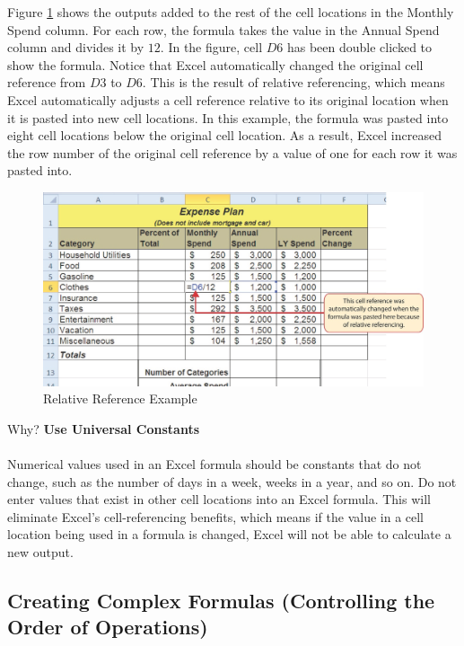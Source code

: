 Figure \ref{02:fig05} shows the outputs added to the rest of the cell locations in the Monthly Spend column. For each row, the formula takes the value in the Annual Spend column and divides it by $ 12 $. In the figure, cell $ D6 $ has been double clicked to show the formula. Notice that Excel automatically changed the original cell reference from $ D3 $ to $ D6 $. This is the result of relative referencing, which means Excel automatically adjusts a cell reference relative to its original location when it is pasted into new cell locations. In this example, the formula was pasted into eight cell locations below the original cell location. As a result, Excel increased the row number of the original cell reference by a value of one for each row it was pasted into.

\begin{figure}[H]
	\centering
	\includegraphics[width=\maxwidth{.95\linewidth}]{gfx/ch02_fig05}
	\caption{Relative Reference Example}
	\label{02:fig05}
\end{figure}

\begin{center}
	\begin{infobox}{Why?}
		\textbf{Use Universal Constants}
		\\
		\\
		Numerical values used in an Excel formula should be constants that do not change, such as the number of days in a week, weeks in a year, and so on. Do not enter values that exist in other cell locations into an Excel formula. This will eliminate Excel's cell-referencing benefits, which means if the value in a cell location being used in a formula is changed, Excel will not be able to calculate a new output.
	\end{infobox}
\end{center}

\subsection{Creating Complex Formulas (Controlling the Order of Operations)}

